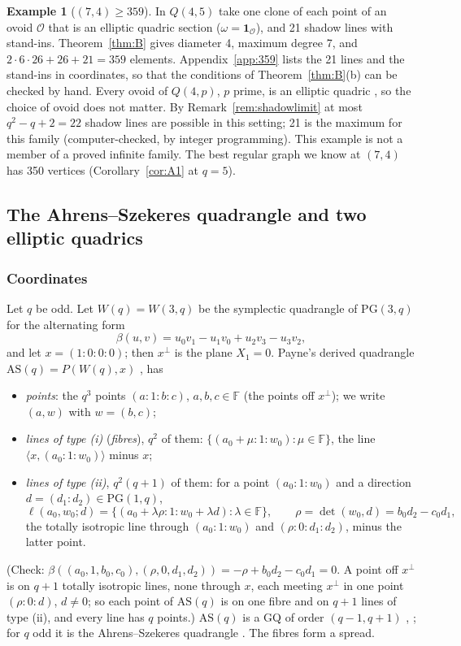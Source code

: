 \documentclass[11pt]{amsart}
\theoremstyle{definition}
\newtheorem{example}[theorem]{Example}
\theoremstyle{remark}
\numberwithin{equation}{section}
\newcommand{\F}{\mathbb F}
\newcommand{\PG}{\mathrm{PG}}
\newcommand{\AS}{\mathrm{AS}}
\newcommand{\cO}{\mathcal O}
\begin{document}
\begin{example}[$(7,4)\ge359$]\label{ex:359}
In $Q(4,5)$ take one clone of each point of an ovoid $\cO$ that is an elliptic quadric section ($\omega=\mathbf
1_\cO$), and 21 shadow lines with stand-ins. Theorem~\ref{thm:B} gives diameter 4, maximum degree 7, and
$2\cdot6\cdot26+26+21=359$ elements. Appendix~\ref{app:359} lists the 21 lines and the stand-ins in coordinates, so that
the conditions of Theorem~\ref{thm:B}(b) can be checked by hand. Every ovoid of $Q(4,p)$, $p$ prime, is an elliptic
quadric \cite{BGS06}, so the choice of ovoid does not matter. By Remark~\ref{rem:shadowlimit} at most $q^2-q+2=22$ shadow
lines are possible in this setting; 21 is the maximum for this family (computer-checked, by integer programming).
This example is not a member of a proved infinite family. The best regular graph we know at $(7,4)$ has 350 vertices
(Corollary~\ref{cor:A1} at $q=5$).
\end{example}

\subsection{The Ahrens--Szekeres quadrangle and two elliptic quadrics}\label{ssec:A}

\subsubsection*{Coordinates}
Let $q$ be odd. Let $W(q)=W(3,q)$ be the symplectic quadrangle of $\PG(3,q)$ for the alternating form
\[
\beta(u,v)=u_0v_1-u_1v_0+u_2v_3-u_3v_2,
\]
and let $x=(1:0:0:0)$; then $x^\perp$ is the plane $X_1=0$. Payne's derived quadrangle $\AS(q)=P(W(q),x)$
\cite{P71}, \cite[3.1.4]{PT} has
\begin{itemize}
\item \emph{points}: the $q^3$ points $(a:1:b:c)$, $a,b,c\in\F$ (the points off $x^\perp$); we write $(a,w)$ with
  $w=(b,c)$;
\item \emph{lines of type (i)} (\emph{fibres}), $q^2$ of them: $\{(a_0+\mu:1:w_0):\mu\in\F\}$, the line
  $\langle x,(a_0:1:w_0)\rangle$ minus $x$;
\item \emph{lines of type (ii)}, $q^2(q+1)$ of them: for a point $(a_0:1:w_0)$ and a direction $d=(d_1:d_2)\in\PG(1,q)$,
  \[
  \ell(a_0,w_0;d)=\{(a_0+\lambda\rho:1:w_0+\lambda d):\lambda\in\F\},\qquad \rho=\det(w_0,d)=b_0d_2-c_0d_1,
  \]
  the totally isotropic line through $(a_0:1:w_0)$ and $(\rho:0:d_1:d_2)$, minus the latter point.
\end{itemize}
(Check: $\beta((a_0,1,b_0,c_0),(\rho,0,d_1,d_2))=-\rho+b_0d_2-c_0d_1=0$. A point off $x^\perp$ is on $q+1$ totally isotropic
lines, none through $x$, each meeting $x^\perp$ in one point $(\rho:0:d)$, $d\ne0$; so each point of $\AS(q)$ is on one
fibre and on $q+1$ lines of type (ii), and every line has $q$ points.) $\AS(q)$ is a GQ of order $(q-1,q+1)$ \cite{P71},
\cite[3.1.4, 3.2.6]{PT}; for $q$ odd it is the Ahrens--Szekeres quadrangle \cite{AS69}. The fibres form a spread.
\end{document}
